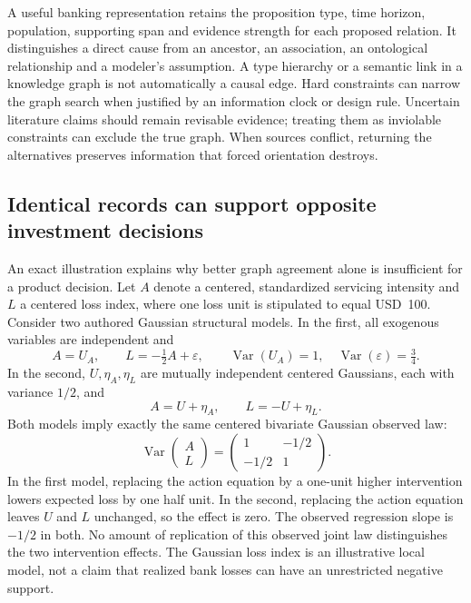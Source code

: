 A useful banking representation retains the proposition type, time horizon,
population, supporting span and evidence strength for each proposed relation.
It distinguishes a direct cause from an ancestor, an association, an ontological
relationship and a modeler's assumption. A type hierarchy or a semantic link in
a knowledge graph is not automatically a causal edge. Hard constraints can narrow
the graph search when justified by an information clock or design rule. Uncertain
literature claims should remain revisable evidence; treating them as inviolable
constraints can exclude the true graph. When sources conflict, returning the
alternatives preserves information that forced orientation destroys.

\subsection{Identical records can support opposite investment decisions}
\label{exec22:domain-value}

An exact illustration explains why better graph agreement alone is insufficient
for a product decision. Let \(A\) denote a centered, standardized servicing
intensity and \(L\) a centered loss index, where one loss unit is stipulated to
equal USD~100. Consider two authored Gaussian structural models. In the first,
all exogenous variables are independent and
\begin{equation}
 A=U_A,\qquad L=-\tfrac12 A+\varepsilon,
 \qquad \operatorname{Var}(U_A)=1,\quad
 \operatorname{Var}(\varepsilon)=\tfrac34.
 \label{exec22:domain-causal}
\end{equation}
In the second, \(U,\eta_A,\eta_L\) are mutually independent centered Gaussians,
each with variance \(1/2\), and
\begin{equation}
 A=U+\eta_A,\qquad L=-U+\eta_L.
 \label{exec22:domain-latent}
\end{equation}
Both models imply exactly the same centered bivariate Gaussian observed law:
\begin{equation}
 \operatorname{Var}\!\begin{pmatrix}A\\L\end{pmatrix}=
 \begin{pmatrix}1&-1/2\\-1/2&1\end{pmatrix}.
 \label{exec22:domain-covariance}
\end{equation}
In the first model, replacing the action equation
by a one-unit higher intervention lowers expected loss by one half unit. In the
second, replacing the action equation leaves \(U\) and \(L\) unchanged, so the
effect is zero. The observed regression slope is \(-1/2\) in both. No amount
of replication of this observed joint law distinguishes the two intervention
effects. The Gaussian loss index is an illustrative local model, not a claim
that realized bank losses can have an unrestricted negative support.
\cite{exec22_domain_reference}

